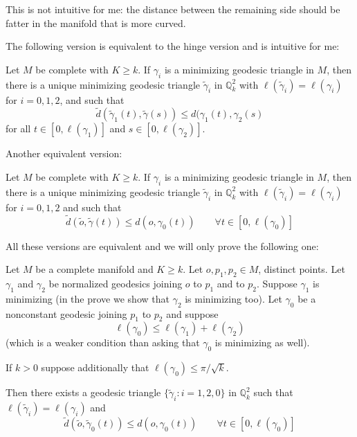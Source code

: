 This is not intuitive for me: the distance between the remaining side should be
fatter in the manifold that is more curved.

The following version is equivalent to the hinge version and is intuitive for
me:

\begin{theorem}[Toponogov]
\label{theorem-Toponogov-hinge2}
Let $M$ be complete with $K\geq k$. If $\gamma_i$ is a minimizing geodesic
triangle in $M$, then there is a unique minimizing geodesic triangle
$\tilde{\gamma}_i$ in $\mathbb{Q}_k^2$ with
$\ell(\tilde{\gamma}_i)=\ell(\gamma_i)$ for $i=0,1,2$, and such that
\begin{equation}
\label{equation-Toponogov-hinge2}
\tilde{d}(\tilde{\gamma}_1(t),\tilde{\gamma}(s))\leq
d(\gamma_1(t),\gamma_2(s)
\end{equation}
for all $t\in[0,\ell(\gamma_1)]$ and $s\in[0,\ell(\gamma_2)]$.
\end{theorem}

Another equivalent version:
\begin{theorem}[Toponogov]
\label{theorem-Toponogov-hinge3}
Let $M$ be complete with $K\geq k$. If $\gamma_i$ is a minimizing geodesic
triangle in $M$, then there is a unique minimizing geodesic triangle
$\tilde{\gamma}_i$ in $\mathbb{Q}_k^2$ with
$\ell(\tilde{\gamma}_i)=\ell(\gamma_i)$ for $i=0,1,2$ and such that
\begin{equation}
\label{equation-Toponogov-hinge3}
\tilde{d}(\tilde{o},\tilde{\gamma}(t))\leq d(o,\gamma_0(t))
\qquad \forall t\in[0,\ell(\gamma_0)]
\end{equation}
\end{theorem}
All these versions are equivalent and we will only prove the following one:
\begin{theorem}
\label{theorem-Toponogov-metric}
Let $M$ be a complete manifold and $K \geq k$. Let $o,p_1,p_2 \in M$, distinct
points. Let $\gamma_1$ and $\gamma_2$ be normalized geodesics joining 
$o$ to $p_1$ and to $p_2$. Suppose $\gamma_1$ is minimizing (in the prove we
show that $\gamma_2$ is minimizing too).
Let $\gamma_0$ be a nonconstant geodesic joining $p_1$ to $p_2$ and suppose
$$
\ell(\gamma_0) \leq \ell(\gamma_1) +\ell(\gamma_2)
$$
(which is a weaker condition than asking that $\gamma_0$ is minimizing as well).

If $k>0$ suppose additionally that $\ell(\gamma_0) \leq \pi/\sqrt{k}$.

Then there exists a geodesic triangle $\{\tilde{\gamma}_i:i=1,2,0\}$ in
$\mathbb{Q}_k^2$ such that $\ell(\tilde{\gamma}_i) = \ell(\gamma_i)$ and
\begin{equation}
\label{equation-Toponogov-metric}
\tilde{d}(\tilde{o},\tilde{\gamma}_0(t)) 
\leq  d(o,\gamma_0(t))
\qquad \forall t \in[0,\ell(\gamma_0)]
\end{equation}
\end{theorem}

